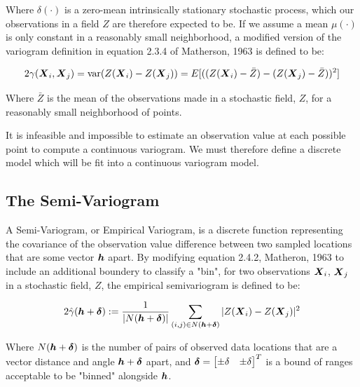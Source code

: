 \documentclass[11pt]{ucthesis}
\newcommand{\vect}[1]{{\it{\boldsymbol{#1}}}}
\begin{document}
Where $\delta(\cdot)$ is a zero-mean intrinsically stationary stochastic process, which our observations in a field $Z$ are therefore expected to be. If we assume a mean $\mu(\cdot)$ is only constant in a reasonably small neighborhood, a modified version of the variogram definition in equation 2.3.4 of Matherson, 1963 \cite{matheron:geostat} is defined to be:

\begin{equation}
	2\gamma(\vect{X}_i, \vect{X}_j)= \text{var} (Z(\vect{X}_{i}) - Z(\vect{X}_{j}))=E[( (Z(\vect{X}_{i}) - \bar{Z} ) - (Z(\vect{X}_{j}) - \bar{Z} ))^2]
    \label{eq:cont_var}
\end{equation}

Where $\bar{Z}$ is the mean of the observations made in a stochastic field, $Z$, for a reasonably small neighborhood of points.

It is infeasible and impossible to estimate an observation value at each possible point to compute a continuous variogram. We must therefore define a discrete model which will be fit into a continuous variogram model.

\subsection{The Semi-Variogram}
A Semi-Variogram, or Empirical Variogram, is a discrete function representing the covariance of the observation value difference between two sampled locations that are some vector $\vect{h}$ apart. By modifying equation 2.4.2, Matheron, 1963 \cite{matheron:geostat} to include an additional boundery to classify a "bin", for two observations $\vect{X}_{i}$, $\vect{X}_{j}$ in a stochastic field, $Z$, the empirical semivariogram is defined to be:

\begin{equation} 
    \label{eq:exp_var}
    2\hat{\gamma}(\vect{h}+\vect{\delta}) := \frac{1}{|N(\vect{h}+\vect{\delta})|}\sum\limits_{(i,j)\in N(\vect{h}+\vect{\delta})}|Z(\vect{X}_i) - Z(\vect{X}_j)|^2 %
\end{equation}

Where $N(\vect{h}+\vect{\delta})$ is the number of pairs of observed data locations that are a vector distance and angle $\vect{h}+\vect{\delta}$ apart, and $\vect{\delta} = \begin{bmatrix}\pm\delta & \pm\delta\end{bmatrix}^{T}$ is a bound of ranges acceptable to be "binned" alongside $\vect{h}$.
\end{document}
